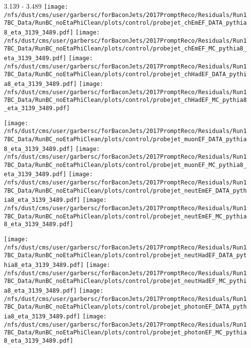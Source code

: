 \documentclass[t,compress]{beamer}
\begin{document}
\begin{frame}{3.139 - 3.489}
	\texttt{[image: /nfs/dust/cms/user/garbersc/forBaconJets/2017PromptReco/Residuals/Run17BC\_Data/RunBC\_noEtaPhiClean/plots/control/probejet\_chEmEF\_DATA\_pythia8\_eta\_3139\_3489.pdf]}
	\texttt{[image: /nfs/dust/cms/user/garbersc/forBaconJets/2017PromptReco/Residuals/Run17BC\_Data/RunBC\_noEtaPhiClean/plots/control/probejet\_chEmEF\_MC\_pythia8\_eta\_3139\_3489.pdf]}
	\texttt{[image: /nfs/dust/cms/user/garbersc/forBaconJets/2017PromptReco/Residuals/Run17BC\_Data/RunBC\_noEtaPhiClean/plots/control/probejet\_chHadEF\_DATA\_pythia8\_eta\_3139\_3489.pdf]}
	\texttt{[image: /nfs/dust/cms/user/garbersc/forBaconJets/2017PromptReco/Residuals/Run17BC\_Data/RunBC\_noEtaPhiClean/plots/control/probejet\_chHadEF\_MC\_pythia8\_eta\_3139\_3489.pdf]}
\newline

\vspace{-0.65cm}
	\texttt{[image: /nfs/dust/cms/user/garbersc/forBaconJets/2017PromptReco/Residuals/Run17BC\_Data/RunBC\_noEtaPhiClean/plots/control/probejet\_muonEF\_DATA\_pythia8\_eta\_3139\_3489.pdf]}
	\texttt{[image: /nfs/dust/cms/user/garbersc/forBaconJets/2017PromptReco/Residuals/Run17BC\_Data/RunBC\_noEtaPhiClean/plots/control/probejet\_muonEF\_MC\_pythia8\_eta\_3139\_3489.pdf]}
	\texttt{[image: /nfs/dust/cms/user/garbersc/forBaconJets/2017PromptReco/Residuals/Run17BC\_Data/RunBC\_noEtaPhiClean/plots/control/probejet\_neutEmEF\_DATA\_pythia8\_eta\_3139\_3489.pdf]}
	\texttt{[image: /nfs/dust/cms/user/garbersc/forBaconJets/2017PromptReco/Residuals/Run17BC\_Data/RunBC\_noEtaPhiClean/plots/control/probejet\_neutEmEF\_MC\_pythia8\_eta\_3139\_3489.pdf]}
\newline

\vspace{-0.65cm}
	\texttt{[image: /nfs/dust/cms/user/garbersc/forBaconJets/2017PromptReco/Residuals/Run17BC\_Data/RunBC\_noEtaPhiClean/plots/control/probejet\_neutHadEF\_DATA\_pythia8\_eta\_3139\_3489.pdf]}
	\texttt{[image: /nfs/dust/cms/user/garbersc/forBaconJets/2017PromptReco/Residuals/Run17BC\_Data/RunBC\_noEtaPhiClean/plots/control/probejet\_neutHadEF\_MC\_pythia8\_eta\_3139\_3489.pdf]}
	\texttt{[image: /nfs/dust/cms/user/garbersc/forBaconJets/2017PromptReco/Residuals/Run17BC\_Data/RunBC\_noEtaPhiClean/plots/control/probejet\_photonEF\_DATA\_pythia8\_eta\_3139\_3489.pdf]}
	\texttt{[image: /nfs/dust/cms/user/garbersc/forBaconJets/2017PromptReco/Residuals/Run17BC\_Data/RunBC\_noEtaPhiClean/plots/control/probejet\_photonEF\_MC\_pythia8\_eta\_3139\_3489.pdf]}
\end{frame}
\end{document}
